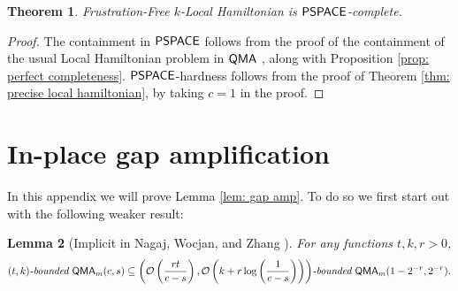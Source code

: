\documentclass[11pt]{article}
\newtheorem{theorem}{Theorem}
\newtheorem{lemma}[theorem]{Lemma}
\theoremstyle{definition}
\theoremstyle{remark}
\newcommand\QMA{{\sf{QMA}}}
\newcommand\PSPACE{{\sf{PSPACE}}}
\newcommand\bddQMA[5]{{\left(#1,#2\right)}\textit{-bounded }\QMA_{#3}(#4,#5)}
\begin{document}
\begin{theorem} \label{thm: frustration free}
Frustration-Free $k$-Local Hamiltonian is $\PSPACE$-complete.
\end{theorem}
\begin{proof}
The containment in $\PSPACE$ follows from the proof of the containment of the usual Local Hamiltonian problem in $\QMA$ \cite{ksv02}, along with Proposition \ref{prop: perfect completeness}. $\PSPACE$-hardness follows from the proof of Theorem \ref{thm: precise local hamiltonian}, by taking $c=1$ in the proof.
\end{proof}
\section{In-place gap amplification} \label{app: gap amplification}
In this appendix we will prove Lemma \ref{lem: gap amp}. To do so we first start out with the following weaker result:
\begin{lemma}[Implicit in Nagaj, Wocjan, and Zhang \cite{nwz11}] \label{lem: gap amp 1}
For any functions $t,k,r>0$, 
\[
\bddQMA{t}{k}{m}{c}{s}\subseteq\bddQMA{\mathcal{O}\left(\frac{rt}{c-s}\right)}{\mathcal{O}\left(k+r\log\left(\frac{1}{c-s}\right)\right)}{m}{1-2^{-r}}{2^{-r}}.
\]
\end{lemma}
\end{document}
